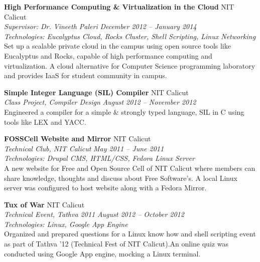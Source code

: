 \documentclass[margin,line]{resume}
\begin{document}
\begin{resume}
    \textbf{High Performance Computing \& Virtualization in the Cloud} 				\hfill NIT Calicut \\
      \textit{Supervisor: Dr. Vineeth Paleri } 			\hfill \textit{December 2012 -- January 2014}\\
      \textit{Technologies: Eucalyptus Cloud, Rocks Cluster, Shell Scripting, Linux Networking}\\
    Set up a scalable private cloud in the campus using open source tools like Eucalyptus and Rocks,
capable of high performance computing and virtualization. A cloud alternative for Computer Science
programming laboratory and provides IaaS for student community in campus.
	
	\vspace{2mm}%

	   \textbf{Simple Integer Language (SIL) Compiler} 						\hfill NIT Calicut \\
    \textit{Class Project, Compiler Design} 							\hfill \textit{August 2012 – November 2012}\\
	Engineered a compiler for a simple \& strongly typed language, SIL in C using tools like LEX and YACC.
   \vspace{2mm}%
   
   
    \textbf{FOSSCell Website and Mirror} 						\hfill NIT Calicut \\
    \textit{Technical Club, NIT Calicut} 							\hfill \textit{May 2011 – June 2011}\\
    \textit{Technologies: Drupal CMS, HTML/CSS, Fedora Linux Server} \\
	A new website for Free and Open Source Cell of NIT Calicut where members can share knowledge,
thoughts and discuss about Free Software’s. A local Linux server was configured to host website
along with a Fedora Mirror.
   
   \vspace{2mm}%
   
    
    \textbf{Tux of War} 								\hfill NIT Calicut \\
    \textit{Technical Event, Tathva 2011} 							\hfill \textit{August 2012 -- October 2012}\\
    \textit{Technologies: Linux, Google App Engine} \\
   Organized and prepared questions for a Linux know how and shell scripting event as part of Tathva ’12 (Technical Fest of NIT      Calicut).An online quiz was conducted using Google App engine, mocking a Linux terminal.
\pagebreak


\end{resume}
\end{document}
